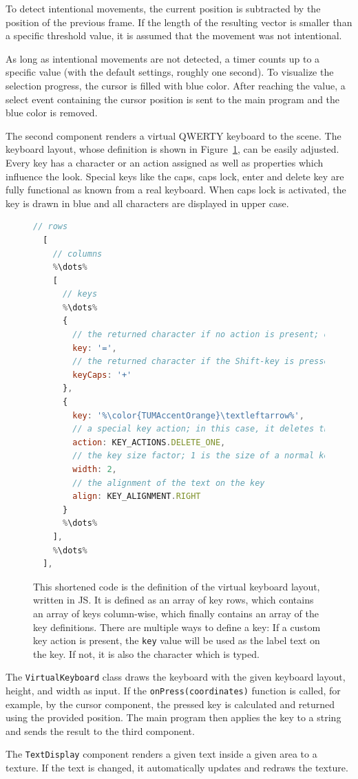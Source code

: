 To detect intentional movements, the current position is subtracted by the position of the previous frame. If the length of the resulting vector is smaller than a specific threshold value, it is assumed that the movement was not intentional.

As long as intentional movements are not detected, a timer counts up to a specific value (with the default settings, roughly one second). To visualize the selection progress, the cursor is filled with blue color. After reaching the value, a select event containing the cursor position is sent to the main program and the blue color is removed. 

The second component renders a virtual QWERTY keyboard to the scene. The keyboard layout, whose definition is shown in Figure~\ref{fig:virtual-keyboard-layout}, can be easily adjusted. Every key has a character or an action assigned as well as properties which influence the look. Special keys like the caps, caps lock, enter and delete key are fully functional as known from a real keyboard. When caps lock is activated, the key is drawn in blue and all characters are displayed in upper case.

\begin{figure}[H]
	\begin{lstlisting}[language=JavaScript]
  // rows
  [
    // columns
    %\dots%
    [ 
      // keys
      %\dots%
      {
        // the returned character if no action is present; otherwise just a label
        key: '=',
        // the returned character if the Shift-key is pressed
        keyCaps: '+'
      },
      {
        key: '%\color{TUMAccentOrange}\textleftarrow%',
        // a special key action; in this case, it deletes the last character
        action: KEY_ACTIONS.DELETE_ONE,
        // the key size factor; 1 is the size of a normal key
        width: 2, 
        // the alignment of the text on the key
        align: KEY_ALIGNMENT.RIGHT
      }
      %\dots%
    ],
    %\dots%
  ],
  \end{lstlisting}
	\caption[Virtual keyboard layout definition]{This shortened code is the definition of the virtual keyboard layout, written in \gls{JS}. It is defined as an array of key rows, which contains an array of keys column-wise, which finally contains an array of the key definitions. There are multiple ways to define a key: If a custom key action is present, the \lstinline{key} value will be used as the label text on the key. If not, it is also the character which is typed. }\label{fig:virtual-keyboard-layout}
\end{figure}

The \lstinline{VirtualKeyboard} class draws the keyboard with the given keyboard layout, height, and width as input. If the \lstinline{onPress(coordinates)} function is called, for example, by the cursor component, the pressed key is calculated and returned using the provided position. The main program then applies the key to a string and sends the result to the third component. %

The \lstinline{TextDisplay} component renders a given text inside a given area to a texture. If the text is changed, it automatically updates and redraws the texture.